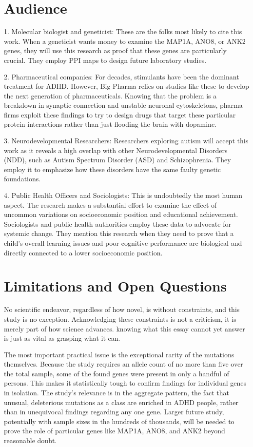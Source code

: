 \section{Audience}  

1.  Molecular biologist and geneticist: 
These are the folks most likely to cite this work.  When a geneticist wants money to examine the MAP1A, ANO8, or ANK2 genes, they will use this research as proof that these genes are particularly crucial.  They employ PPI maps to design future laboratory studies.  

2.  Pharmaceutical companies: 
For decades, stimulants have been the dominant treatment for ADHD.  However, Big Pharma relies on studies like these to develop the next generation of pharmaceuticals. 
Knowing that the problem is a breakdown in synaptic connection and unstable neuronal cytoskeletons, pharma firms exploit these findings to try to design drugs that target these particular protein interactions rather than just flooding the brain with dopamine.  

3.  Neurodevelopmental Researchers: 
Researchers exploring autism will accept this work as it reveals a high overlap with other Neurodevelopmental Disorders (NDD), such as Autism Spectrum Disorder (ASD) and Schizophrenia.  They employ it to emphasize how these disorders have the same faulty genetic foundations.  

4.  Public Health Officers and Sociologists: 
This is undoubtedly the most human aspect.  The research makes a substantial effort to examine the effect of uncommon variations on socioeconomic position and educational achievement. 
Sociologists and public health authorities employ these data to advocate for systemic change.  They mention this research when they need to prove that a child's overall learning issues and poor cognitive performance are biological and directly connected to a lower socioeconomic position.  

\section{Limitations and Open Questions}  

No scientific endeavor, regardless of how novel, is without constraints, and this study is no exception.  Acknowledging these constraints is not a criticism, it is merely part of how science advances.  knowing what this essay cannot yet answer is just as vital as grasping what it can.  

The most important practical issue is the exceptional rarity of the mutations themselves.  Because the study requires an allele count of no more than five over the total sample, some of the found genes were present in only a handful of persons.  This makes it statistically tough to confirm findings for individual genes in isolation.  The study's relevance is in the aggregate pattern, the fact that unusual, deleterious mutations as a class are enriched in ADHD people, rather than in unequivocal findings regarding any one gene.  Larger future study, potentially with sample sizes in the hundreds of thousands, will be needed to prove the role of particular genes like MAP1A, ANO8, and ANK2 beyond reasonable doubt.  

